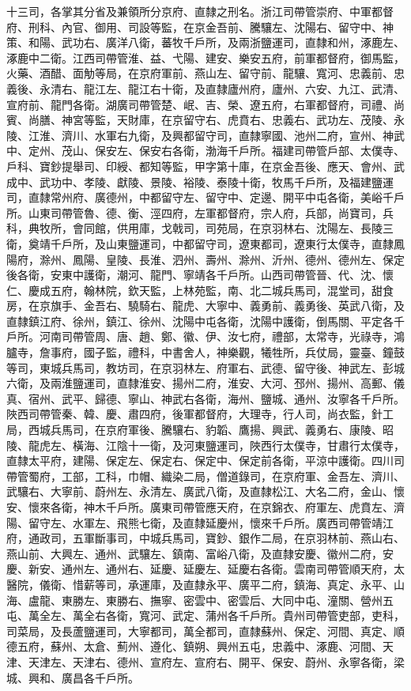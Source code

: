 十三司，各掌其分省及兼領所分京府、直隸之刑名。浙江司帶管崇府、中軍都督府、刑科、內官、御用、司設等監，在京金吾前、騰驤左、沈陽右、留守中、神策、和陽、武功右、廣洋八衛，蕃牧千戶所，及兩浙鹽運司，直隸和州，涿鹿左、涿鹿中二衛。江西司帶管淮、益、弋陽、建安、樂安五府，前軍都督府，御馬監，火藥、酒醋、面觔等局，在京府軍前、燕山左、留守前、龍驤、寬河、忠義前、忠義後、永清右、龍江左、龍江右十衛，及直隸廬州府，廬州、六安、九江、武清、宣府前、龍門各衛。湖廣司帶管楚、岷、吉、榮、遼五府，右軍都督府，司禮、尚賓、尚膳、神宮等監，天財庫，在京留守右、虎賁右、忠義右、武功左、茂陵、永陵、江淮、濟川、水軍右九衛，及興都留守司，直隸寧國、池州二府，宣州、神武中、定州、茂山、保安左、保安右各衛，渤海千戶所。福建司帶管戶部、太僕寺、戶科、寶鈔提舉司、印綬、都知等監，甲字第十庫，在京金吾後、應天、會州、武成中、武功中、孝陵、獻陵、景陵、裕陵、泰陵十衛，牧馬千戶所，及福建鹽運司，直隸常州府、廣德州，中都留守左、留守中、定邊、開平中屯各衛，美峪千戶所。山東司帶管魯、德、衡、涇四府，左軍都督府，宗人府，兵部，尚寶司，兵科，典牧所，會同館，供用庫，戈戟司，司苑局，在京羽林右、沈陽左、長陵三衛，奠靖千戶所，及山東鹽運司，中都留守司，遼東都司，遼東行太僕寺，直隸鳳陽府，滁州、鳳陽、皇陵、長淮、泗州、壽州、滁州、沂州、德州、德州左、保定後各衛，安東中護衛，潮河、龍門、寧靖各千戶所。山西司帶管晉、代、沈、懷仁、慶成五府，翰林院，欽天監，上林苑監，南、北二城兵馬司，混堂司，甜食房，在京旗手、金吾右、驍騎右、龍虎、大寧中、義勇前、義勇後、英武八衛，及直隸鎮江府、徐州，鎮江、徐州、沈陽中屯各衛，沈陽中護衛，倒馬關、平定各千戶所。河南司帶管周、唐、趙、鄭、徽、伊、汝七府，禮部，太常寺，光祿寺，鴻臚寺，詹事府，國子監，禮科，中書舍人，神樂觀，犧牲所，兵仗局，靈臺、鐘鼓等司，東城兵馬司，教坊司，在京羽林左、府軍右、武德、留守後、神武左、彭城六衛，及兩淮鹽運司，直隸淮安、揚州二府，淮安、大河、邳州、揚州、高郵、儀真、宿州、武平、歸德、寧山、神武右各衛，海州、鹽城、通州、汝寧各千戶所。陜西司帶管秦、韓、慶、肅四府，後軍都督府，大理寺，行人司，尚衣監，針工局，西城兵馬司，在京府軍後、騰驤右、豹韜、鷹揚、興武、義勇右、康陵、昭陵、龍虎左、橫海、江陰十一衛，及河東鹽運司，陜西行太僕寺，甘肅行太僕寺，直隸太平府，建陽、保定左、保定右、保定中、保定前各衛，平涼中護衛。四川司帶管蜀府，工部，工科，巾帽、織染二局，僧道錄司，在京府軍、金吾左、濟川、武驤右、大寧前、蔚州左、永清左、廣武八衛，及直隸松江、大名二府，金山、懷安、懷來各衛，神木千戶所。廣東司帶管應天府，在京錦衣、府軍左、虎賁左、濟陽、留守左、水軍左、飛熊七衛，及直隸延慶州，懷來千戶所。廣西司帶管靖江府，通政司，五軍斷事司，中城兵馬司，寶鈔、銀作二局，在京羽林前、燕山右、燕山前、大興左、通州、武驤左、鎮南、富峪八衛，及直隸安慶、徽州二府，安慶、新安、通州左、通州右、延慶、延慶左、延慶右各衛。雲南司帶管順天府，太醫院，儀衛、惜薪等司，承運庫，及直隸永平、廣平二府，鎮海、真定、永平、山海、盧龍、東勝左、東勝右、撫寧、密雲中、密雲后、大同中屯、潼關、營州五屯、萬全左、萬全右各衛，寬河、武定、蒲州各千戶所。貴州司帶管吏部，吏科，司菜局，及長蘆鹽運司，大寧都司，萬全都司，直隸蘇州、保定、河間、真定、順德五府，蘇州、太倉、薊州、遵化、鎮朔、興州五屯，忠義中、涿鹿、河間、天津、天津左、天津右、德州、宣府左、宣府右、開平、保安、蔚州、永寧各衛，梁城、興和、廣昌各千戶所。

